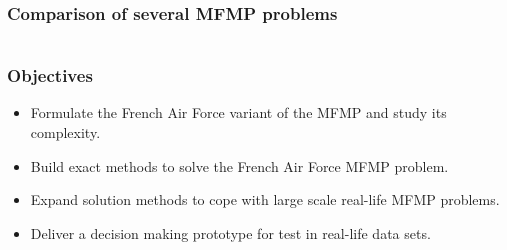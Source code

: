 \begin{frame}
\frametitle{\textbf{Comparison of several MFMP problems}}

  \begin{columns}
    \column{\dimexpr\paperwidth-10pt}
    \begin{tiny}
      
    \end{tiny}
  \end{columns}

\end{frame}

\begin{frame}
\frametitle{\textbf{Objectives}}
  \begin{itemize}[<+->]
  \item 
    Formulate the French Air Force variant of the MFMP and study its complexity.
  \item
    Build exact methods to solve the French Air Force MFMP problem.
  \item
    Expand solution methods to cope with large scale real-life MFMP problems.
  \item
    Deliver a decision making prototype for test in real-life data sets.
  \end{itemize}
\end{frame}
 

  












